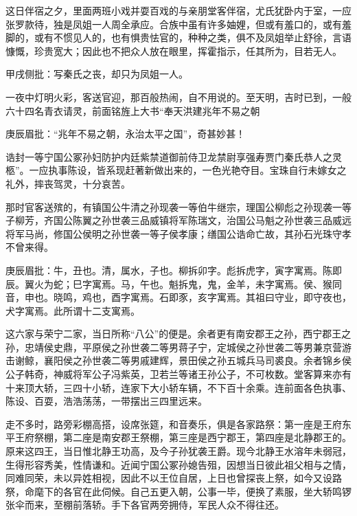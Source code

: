\begin{parag}


    这日伴宿之夕，里面两班小戏并耍百戏的与亲朋堂客伴宿，尤氏犹卧内于室，一应张罗款待，独是凤姐一人周全承应。合族中虽有许多妯娌，但或有羞口的，或有羞脚的，或有不惯见人的，也有惧贵怯官的，种种之类，俱不及凤姐举止舒徐，言语慷慨，珍贵宽大；因此也不把众人放在眼里，挥霍指示，任其所为，目若无人。\begin{note}甲戌侧批：写秦氏之丧，却只为凤姐一人。\end{note}一夜中灯明火彩，客送官迎，那百般热闹，自不用说的。至天明，吉时已到，一般六十四名青衣请灵，前面铭旌上大书“奉天洪建兆年不易之朝\begin{note}庚辰眉批：“兆年不易之朝，永治太平之国”，奇甚妙甚！\end{note}诰封一等宁国公冢孙妇防护内廷紫禁道御前侍卫龙禁尉享强寿贾门秦氏恭人之灵柩”。一应执事陈设，皆系现赶著新做出来的，一色光艳夺目。宝珠自行未嫁女之礼外，摔丧驾灵，十分哀苦。
\end{parag}


\begin{parag}


    那时官客送殡的，有镇国公牛清之孙现袭一等伯牛继宗，理国公柳彪之孙现袭一等子柳芳，齐国公陈翼之孙世袭三品威镇将军陈瑞文，治国公马魁之孙世袭三品威远将军马尚，修国公侯明之孙世袭一等子侯孝康；缮国公诰命亡故，其孙石光珠守孝不曾来得。\begin{note}庚辰眉批：牛，丑也。清，属水，子也。柳拆卯字。彪拆虎字，寅字寓焉。陈即辰。翼火为蛇；巳字寓焉。马，午也。魁拆鬼，鬼，金羊，未字寓焉。侯、猴同音，申也。晓鸣，鸡也，酉字寓焉。石即豕，亥字寓焉。其祖曰守业，即守夜也，犬字寓焉。此所谓十二支寓焉。\end{note}这六家与荣宁二家，当日所称“八公”的便是。余者更有南安郡王之孙，西宁郡王之孙，忠靖侯史鼎，平原侯之孙世袭二等男蒋子宁，定城侯之孙世袭二等男兼京营游击谢鲸，襄阳侯之孙世袭二等男戚建辉，景田侯之孙五城兵马司裘良。余者锦乡侯公子韩奇，神威将军公子冯紫英，卫若兰等诸王孙公子，不可枚数。堂客算来亦有十来顶大轿，三四十小轿，连家下大小轿车辆，不下百十余乘。连前面各色执事、陈设、百耍，浩浩荡荡，一带摆出三四里远来。
\end{parag}


\begin{parag}


    走不多时，路旁彩棚高搭，设席张筵，和音奏乐，俱是各家路祭：第一座是王府东平王府祭棚，第二座是南安郡王祭棚，第三座是西宁郡王，第四座是北静郡王的。原来这四王，当日惟北静王功高，及今子孙犹袭王爵。现今北静王水溶年未弱冠，生得形容秀美，性情谦和。近闻宁国公冢孙媳告殂，因想当日彼此祖父相与之情，同难同荣，未以异姓相视，因此不以王位自居，上日也曾探丧上祭，如今又设路祭，命麾下的各官在此伺候。自己五更入朝，公事一毕，便换了素服，坐大轿鸣锣张伞而来，至棚前落轿。手下各官两旁拥侍，军民人众不得往还。
\end{parag}


